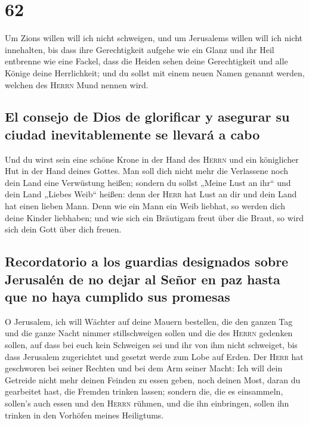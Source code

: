 \hypertarget{section-61}{%
\section{62}\label{section-61}}

 Um Zions willen will ich nicht schweigen, und um
Jerusalems willen will ich nicht innehalten, bis dass ihre Gerechtigkeit
aufgehe wie ein Glanz und ihr Heil entbrenne wie eine Fackel,
 dass die Heiden sehen deine Gerechtigkeit und alle Könige
deine Herrlichkeit; und du sollst mit einem neuen Namen genannt werden,
welchen des \textsc{Herrn} Mund nennen wird.

\hypertarget{el-consejo-de-dios-de-glorificar-y-asegurar-su-ciudad-inevitablemente-se-llevaruxe1-a-cabo}{%
\subsection{El consejo de Dios de glorificar y asegurar su ciudad
inevitablemente se llevará a
cabo}\label{el-consejo-de-dios-de-glorificar-y-asegurar-su-ciudad-inevitablemente-se-llevaruxe1-a-cabo}}

 Und du wirst sein eine schöne Krone in der Hand des
\textsc{Herrn} und ein königlicher Hut in der Hand deines Gottes.
 Man soll dich nicht mehr die Verlassene noch dein Land
eine Verwüstung heißen; sondern du sollst „Meine Lust an ihr`` und dein
Land „Liebes Weib`` heißen: denn der \textsc{Herr} hat Lust an dir und
dein Land hat einen lieben Mann.  Denn wie ein Mann ein
Weib liebhat, so werden dich deine Kinder liebhaben; und wie sich ein
Bräutigam freut über die Braut, so wird sich dein Gott über dich freuen.

\hypertarget{recordatorio-a-los-guardias-designados-sobre-jerusaluxe9n-de-no-dejar-al-seuxf1or-en-paz-hasta-que-no-haya-cumplido-sus-promesas}{%
\subsection{Recordatorio a los guardias designados sobre Jerusalén de no
dejar al Señor en paz hasta que no haya cumplido sus
promesas}\label{recordatorio-a-los-guardias-designados-sobre-jerusaluxe9n-de-no-dejar-al-seuxf1or-en-paz-hasta-que-no-haya-cumplido-sus-promesas}}

 O Jerusalem, ich will Wächter auf deine Mauern bestellen,
die den ganzen Tag und die ganze Nacht nimmer stillschweigen sollen und
die des \textsc{Herrn} gedenken sollen, auf dass bei euch kein Schweigen
sei  und ihr von ihm nicht schweiget, bis dass Jerusalem
zugerichtet und gesetzt werde zum Lobe auf Erden.  Der
\textsc{Herr} hat geschworen bei seiner Rechten und bei dem Arm seiner
Macht: Ich will dein Getreide nicht mehr deinen Feinden zu essen geben,
noch deinen Most, daran du gearbeitet hast, die Fremden trinken lassen;
 sondern die, die es einsammeln, sollen's auch essen und
den \textsc{Herrn} rühmen, und die ihn einbringen, sollen ihn trinken in
den Vorhöfen meines Heiligtums.

